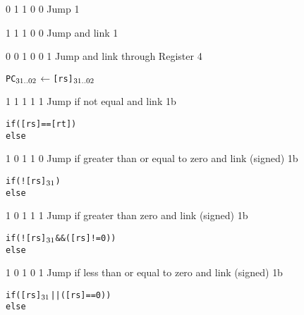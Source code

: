      {0 1 1 0 0} {Jump}    {1}   {\RawTag}
\begin{alltt}
           \rawJxxLb
           \rawJxxZeroLowBits
\end{alltt}\rawInstrEnd

     {1 1 1 0 0} {Jump and link}                   {1}   {\RawTag}
\begin{alltt}
        \rawJxxLink
        \rawJxxLb
        \rawJxxZeroLowBits
\end{alltt}\rawInstrEnd

     {0 0 1 0 0 1} {Jump and link through Register}   {4}   {\RawTag}
\begin{alltt}
        \rawJxxLink
        PC\({\sb{31..02}}\) \(\leftarrow\) [rs]\({\sb{31..02}}\)
        \rawJxxZeroLowBits
\end{alltt}\rawInstrEnd

     {1 1 1 1 1} {Jump if not equal and link}                   {1b}   {\RawTag}
\begin{alltt}
        if ([rs] == [rt])
           \rawJxxLink
           \rawJxxLb
           \rawJxxZeroLowBits
        else
           \rawJxxLink
\end{alltt}\rawInstrEnd

     {1 0 1 1 0} {Jump if greater than or equal to zero and link (signed)}    {1b}   {\RawTag}
\begin{alltt}
        if (![rs]\(\sb{31}\))
           \rawJxxLink
           \rawJxxLb
           \rawJxxZeroLowBits
        else
           \rawJxxLink
\end{alltt}\rawInstrEnd

     {1 0 1 1 1} {Jump if greater than zero and link (signed)}    {1b}   {\RawTag}
\begin{alltt}
        if (![rs]\(\sb{31}\) && ([rs] != 0))
           \rawJxxLink
           \rawJxxLb
           \rawJxxZeroLowBits
        else
           \rawJxxLink
\end{alltt}\rawInstrEnd

     {1 0 1 0 1} {Jump if less than or equal to zero and link (signed)}    {1b}   {\RawTag}
\begin{alltt}
        if ([rs]\(\sb{31}\) || ([rs] == 0))
           \rawJxxLink
           \rawJxxLb
           \rawJxxZeroLowBits
        else
           \rawJxxLink
\end{alltt}\rawInstrEnd


